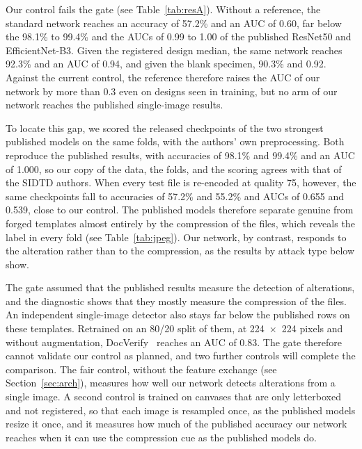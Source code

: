 \documentclass[12pt,a4paper]{article}
\newif\ifshowguidance
\newcommand{\todo}[1]{\ifshowguidance\leavevmode{\color{gray}\itshape [#1]}\fi}
\begin{document}
Our control fails the gate (see Table~\ref{tab:resA}). Without a reference, the standard network reaches an accuracy of 57.2\% and an AUC of 0.60, far below the 98.1\% to 99.4\% and the AUCs of 0.99 to 1.00 of the published ResNet50 and EfficientNet-B3. Given the registered design median, the same network reaches 92.3\% and an AUC of 0.94, and given the blank specimen, 90.3\% and 0.92. Against the current control, the reference therefore raises the AUC of our network by more than 0.3 even on designs seen in training, but no arm of our network reaches the published single-image results.

To locate this gap, we scored the released checkpoints of the two strongest published models on the same folds, with the authors' own preprocessing. Both reproduce the published results, with accuracies of 98.1\% and 99.4\% and an AUC of 1.000, so our copy of the data, the folds, and the scoring agrees with that of the SIDTD authors. When every test file is re-encoded at quality 75, however, the same checkpoints fall to accuracies of 57.2\% and 55.2\% and AUCs of 0.655 and 0.539, close to our control. The published models therefore separate genuine from forged templates almost entirely by the compression of the files, which reveals the label in every fold (see Table~\ref{tab:jpeg}). Our network, by contrast, responds to the alteration rather than to the compression, as the results by attack type below show.

The gate assumed that the published results measure the detection of alterations, and the diagnostic shows that they mostly measure the compression of the files. An independent single-image detector also stays far below the published rows on these templates. Retrained on an 80/20 split of them, at 224~$\times$~224 pixels and without augmentation, DocVerify~\cite{diazrodriguez2026docverify} reaches an AUC of 0.83. The gate therefore cannot validate our control as planned, and two further controls will complete the comparison. The fair control, without the feature exchange (see Section~\ref{sec:arch}), measures how well our network detects alterations from a single image. A second control is trained on canvases that are only letterboxed and not registered, so that each image is resampled once, as the published models resize it once, and it measures how much of the published accuracy our network reaches when it can use the compression cue as the published models do. \todo{Fair control and with-cue control (10 runs each): pending. Paired bootstrap interval of the AUC difference between the median and the fair control.}
\end{document}
